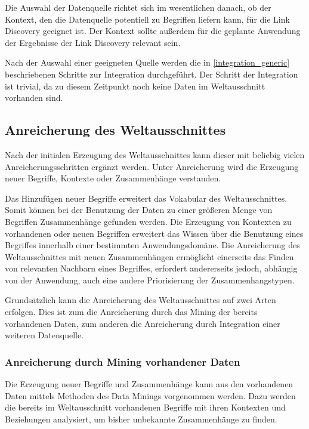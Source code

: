 Die Auswahl der Datenquelle richtet sich im wesentlichen danach, ob der Kontext, den die Datenquelle potentiell zu Begriffen liefern kann, für die Link Discovery geeignet ist. Der Kontext sollte außerdem für die geplante Anwendung der Ergebnisse der Link Discovery relevant sein.

Nach der Auswahl einer geeigneten Quelle werden die in \cref{integration_generic} beschriebenen Schritte zur Integration durchgeführt. Der Schritt der Integration ist trivial, da zu diesem Zeitpunkt noch keine Daten im Weltausschnitt vorhanden sind.

\subsection{Anreicherung des Weltausschnittes}

Nach der initialen Erzeugung des Weltausschnittes kann dieser mit beliebig vielen Anreicherungsschritten ergänzt werden. Unter Anreicherung wird die Erzeugung neuer Begriffe, Kontexte oder Zusammenhänge verstanden.

Das Hinzufügen neuer Begriffe erweitert das Vokabular des Weltausschnittes. Somit können bei der Benutzung der Daten zu einer größeren Menge von Begriffen Zusammenhänge gefunden werden. Die Erzeugung von Kontexten zu vorhandenen oder neuen Begriffen erweitert das Wissen über die Benutzung eines Begriffes innerhalb einer bestimmten Anwendungsdomäne. Die Anreicherung des Weltausschnittes mit neuen Zusammenhängen ermöglicht einerseits das Finden von relevanten Nachbarn eines Begriffes, erfordert andererseits jedoch, abhängig von der Anwendung, auch eine andere Priorisierung der Zusammenhangstypen.

Grundsätzlich kann die Anreicherung des Weltausschnittes auf zwei Arten erfolgen. Dies ist zum die Anreicherung durch das Mining der bereits vorhandenen Daten, zum anderen die Anreicherung durch Integration einer weiteren Datenquelle.

\subsubsection{Anreicherung durch Mining vorhandener Daten}

Die Erzeugung neuer Begriffe und Zusammenhänge kann aus den vorhandenen Daten mittels Methoden des Data Minings vorgenommen werden. Dazu werden die bereits im Weltausschnitt vorhandenen Begriffe mit ihren Kontexten und Beziehungen analysiert, um bisher unbekannte Zusammenhänge zu finden.

